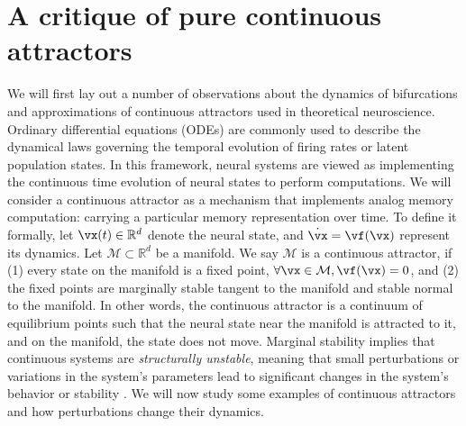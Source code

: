 \documentclass{article} %
\newcounter{ct}
\newcommand{\reals}{\mathbb{R}}
\newcommand{\manifold}{\mathcal{M}}
\theoremstyle{definition}
\theoremstyle{remark}
\begin{document}
\section{A critique of pure continuous attractors}\label{sec:critique}
We will first lay out a number of observations about the dynamics of bifurcations and approximations of continuous attractors used in theoretical neuroscience.
Ordinary differential equations (ODEs) are commonly used to describe the dynamical laws governing the temporal evolution of firing rates or latent population states\cite{vyas2020}.
In this framework, neural systems are viewed as implementing the continuous time evolution of neural states to perform computations.
We will consider a continuous attractor as a mechanism that implements analog memory computation: carrying a particular memory representation over time.
To define it formally, let \(\vx(t) \in \reals^{d}\) denote the neural state, and \(\dot{\vx} = \vf(\vx)\) represent its dynamics.
Let \(\manifold \subset \reals^{d}\) be a manifold.
We say \(\manifold\) is a continuous attractor, if (1) every state on the manifold is a fixed point, \(\forall \vx \in \manifold, \vf(\vx) = 0\), and (2) the fixed points are marginally stable tangent to the manifold and stable normal to the manifold.
In other words, the continuous attractor is a continuum of equilibrium points such that the neural state near the manifold is attracted to it, and on the manifold, the state does not move.
Marginal stability implies that continuous systems are \emph{structurally unstable}, meaning that small perturbations or variations in the system's parameters lead to significant changes in the system's behavior or stability \citep{peixoto1959structural, palis2000structural, robbin1971structural, robinson1974structural}.
We will now study some examples of continuous attractors and how perturbations change their dynamics.

\end{document}
